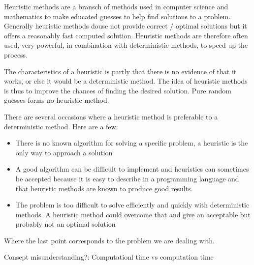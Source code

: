 Heuristic methods are a bransch of methods used in computer science and mathematics to make educated guesses to help find solutions to a problem. Generally heuristic methods douse not provide correct / optimal solutions but it offers a reasonably fast computed solution. Heuristic methods are therefore often used, very powerful, in combination with deterministic methods, to speed up the process.
 
The characteristics of a heuristic is partly that there is no evidence of that it works, or else it would be a deterministic method. The idea of heuristic methods is thus to improve the chances of finding the desired solution. Pure random guesses forms no heuristic method.
 
There are several occasions where a heuristic method is preferable to a deterministic method.
Here are a few:
 
\begin{itemize}
\item There is no known algorithm for solving a specific problem, a heuristic is the only way to approach a solution
\item A good algorithm can be difficult to implement and heuristics can sometimes be accepted because it is easy to describe in a programming language and that heuristic methods are known to produce good results.
\item The problem is too difficult to solve efficiently and quickly with deterministic methods. A heuristic method could overcome that and give an acceptable but probably not an optimal solution
\end{itemize}
 
Where the last point corresponds to the problem we are dealing with.
 
Consept misunderstanding?:
Computationl time vs computation time